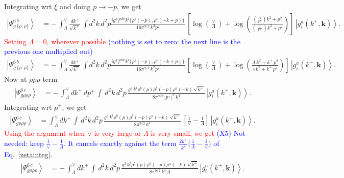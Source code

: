 \documentclass[aps,prd,amsmath,amssymb,nofootinbib]{revtex4-2}
\numberwithin{equation}{section}
\begin{document}
Integrating wrt $\xi$ and doing $p\rightarrow -p$, we get
\begin{align}
    \left|\Psi_{g\,\{\rho,\rho\}}^{6\, b}\right\rangle & =-\,\int_{\Lambda}^{\vee} \frac{dk^{+}}{\sqrt{k^{+}}}\, \int d^{2}k \, d^{2}p \frac{ig^{3}f^{abc}k^{i}\{\rho^{b}(-p),\rho^{c}(-k+p)\}}{16\pi^{9/2}\,k^{2}p^{2}}\,\left[\log{\left(\frac{\vee}{\Lambda}\right)}+\log{\left(\frac{\left(\frac{\Lambda}{k^{+}}\right) k^{2}+p^{2}}{\left(\frac{\vee}{k^{+}} \right)k^{2}+p^{2}}\right)}\right]\,\left|g_{i}^{a}(k^{+},\mathbf{k})\right\rangle.
\end{align}
\textcolor{red}{Setting $\Lambda = 0$, wherever possible} \textcolor{blue}{(nothing is set to zero: the next line is the previous one multiplied out)} 
\begin{align}\label{tworhoafter}
    \left|\Psi_{g\,\{\rho,\rho\}}^{6\, b}\right\rangle & =-\,\int_{\Lambda}^{\vee} \frac{dk^{+}}{\sqrt{k^{+}}}\, \int d^{2}k \, d^{2}p \frac{ig^{3}f^{abc}k^{i}\{\rho^{b}(-p),\rho^{c}(-k+p)\}}{16\pi^{9/2}\,k^{2}p^{2}}\,\left[\log{\left(\frac{\vee}{\Lambda}\right)}+\log{\left(\frac{\Lambda\, k^{2} + k^{+}\,p^{2}}{\vee k^{2}+k^{+}\,p^{2}}\right)}\right]\,\left|g_{i}^{a}(k^{+},\mathbf{k})\right\rangle.
\end{align}
Now at $\rho\rho\rho$ term
\begin{align}
    \left|\Psi_{g\rho\rho\rho}^{6\, c}\right\rangle & = -\, \int_{\Lambda}^{\vee} dk^{+}\, dp^{+}\, \int\, d^{2}k\, d^{2}p\, \frac{g^{3}\, k^{i}\rho^{b}(p)\rho^{b}(-p)\rho^{a}(-k)\,\sqrt{k^{+}}}{8\pi^{9/2}\,|p^{+}|^{2}\,k^{4}}\,\left|g_{i}^{a}(k^{+},\mathbf{k})\right\rangle. 
\end{align}
Integrating wrt $p^{+}$, we get
\begin{align}
    \left|\Psi_{g\rho\rho\rho}^{6\, c}\right\rangle & = \int_{\Lambda}^{\vee} dk^{+}\, \int\, d^{2}k\, d^{2}p\, \frac{g^{3}\, k^{i}\rho^{b}(p)\rho^{b}(-p)\rho^{a}(-k)\,\sqrt{k^{+}}}{8\pi^{9/2}\,k^{4}}\, \left[\frac{1}{\vee}-\frac{1}{\Lambda}\right]\,\left|g_{i}^{a}(k^{+},\mathbf{k})\right\rangle.
\end{align}
\textcolor{red}{Using the argument when $\vee$ is very large or $\Lambda$ is very small, we get} \textcolor{blue}{(X5) Not needed: keep $\frac{1}{\vee}-\frac{1}{\Lambda}$. It cancels exactly against the term $\frac{2k^{+}}{k^{2}}\big(\frac1\Lambda-\frac1\vee\big)$ of Eq.~\eqref{zetainteg}.}
\begin{align}\label{threerhoafter}
        \left|\Psi_{g\rho\rho\rho}^{6\, c}\right\rangle & = -\,\int_{\Lambda}^{\vee} dk^{+}\, \int\, d^{2}k\, d^{2}p\, \frac{g^{3}\, k^{i}\rho^{b}(p)\rho^{b}(-p)\rho^{a}(-k)\,\sqrt{k^{+}}}{8\pi^{9/2}\,k^{4}\, \Lambda}\,\left|g_{i}^{a}(k^{+},\mathbf{k})\right\rangle.
\end{align}
\end{document}
